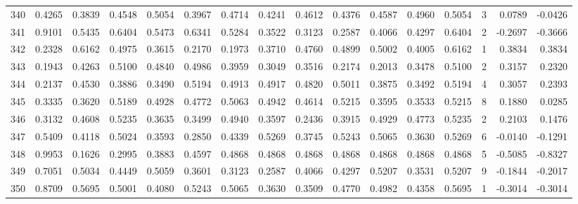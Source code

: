 \begin{tabular}{lrrrrrrrrrrrrrrr}
340 &      0.4265 &  0.3839 &  0.4548 &  0.5054 &  0.3967 &  0.4714 &  0.4241 &  0.4612 &  0.4376 &  0.4587 &   0.4960 &     0.5054 &      3 &                    0.0789 &                    -0.0426 \\
341 &      0.9101 &  0.5435 &  0.6404 &  0.5473 &  0.6341 &  0.5284 &  0.3522 &  0.3123 &  0.2587 &  0.4066 &   0.4297 &     0.6404 &      2 &                   -0.2697 &                    -0.3666 \\
342 &      0.2328 &  0.6162 &  0.4975 &  0.3615 &  0.2170 &  0.1973 &  0.3710 &  0.4760 &  0.4899 &  0.5002 &   0.4005 &     0.6162 &      1 &                    0.3834 &                     0.3834 \\
343 &      0.1943 &  0.4263 &  0.5100 &  0.4840 &  0.4986 &  0.3959 &  0.3049 &  0.3516 &  0.2174 &  0.2013 &   0.3478 &     0.5100 &      2 &                    0.3157 &                     0.2320 \\
344 &      0.2137 &  0.4530 &  0.3886 &  0.3490 &  0.5194 &  0.4913 &  0.4917 &  0.4820 &  0.5011 &  0.3875 &   0.3492 &     0.5194 &      4 &                    0.3057 &                     0.2393 \\
345 &      0.3335 &  0.3620 &  0.5189 &  0.4928 &  0.4772 &  0.5063 &  0.4942 &  0.4614 &  0.5215 &  0.3595 &   0.3533 &     0.5215 &      8 &                    0.1880 &                     0.0285 \\
346 &      0.3132 &  0.4608 &  0.5235 &  0.3635 &  0.3499 &  0.4940 &  0.3597 &  0.2436 &  0.3915 &  0.4929 &   0.4773 &     0.5235 &      2 &                    0.2103 &                     0.1476 \\
347 &      0.5409 &  0.4118 &  0.5024 &  0.3593 &  0.2850 &  0.4339 &  0.5269 &  0.3745 &  0.5243 &  0.5065 &   0.3630 &     0.5269 &      6 &                   -0.0140 &                    -0.1291 \\
348 &      0.9953 &  0.1626 &  0.2995 &  0.3883 &  0.4597 &  0.4868 &  0.4868 &  0.4868 &  0.4868 &  0.4868 &   0.4868 &     0.4868 &      5 &                   -0.5085 &                    -0.8327 \\
349 &      0.7051 &  0.5034 &  0.4449 &  0.5059 &  0.3601 &  0.3123 &  0.2587 &  0.4066 &  0.4297 &  0.5207 &   0.3531 &     0.5207 &      9 &                   -0.1844 &                    -0.2017 \\
350 &      0.8709 &  0.5695 &  0.5001 &  0.4080 &  0.5243 &  0.5065 &  0.3630 &  0.3509 &  0.4770 &  0.4982 &   0.4358 &     0.5695 &      1 &                   -0.3014 &                    -0.3014 \\

\end{tabular}
